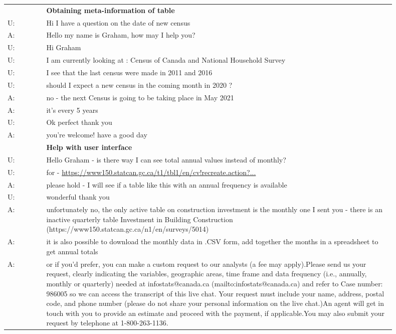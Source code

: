 \documentclass[11pt]{article}
\begin{document}
\begin{table*}[h]
    \small
    \centering
\begin{tabular}{l p{0.90\linewidth}}
\toprule
   & \textbf{Obtaining meta-information of table}\\
U: &  Hi I have a question on the date of new census \\
A: &  Hello my name is Graham, how may I help you? \\
U: &  Hi Graham \\
U: &  I am currently looking at : Census of Canada and National Household Survey \\
U: &  I see that the last census were made in 2011 and 2016 \\
U: &  should I expect a new census in the coming month in 2020 ? \\
A: &  no - the next Census is going to be taking place in May 2021 \\
A: &  it's every 5 years \\
U: &  Ok perfect thank you \\
A: &  you're welcome! have a good day \\
\midrule
& \textbf{Help with user interface}\\
U: & Hello Graham - is there way I can see total annual values instead of monthly?\\
U: & for - \href{https://www150.statcan.gc.ca/t1/tbl1/en/cv!recreate.action?pid=3410017501&selectedNodeIds=1D1,2D13,2D14,2D19,2D28,4D1&checkedLevels=2D1&refPeriods=20200201,20200601&dimensionLayouts=layout3,layout3,layout3,layout2,layout2&vectorDisplay=false}{https://www150.statcan.gc.ca/t1/tbl1/en/cv!recreate.action?...}\\
A: & please hold - I will see if a table like this with an annual frequency is available\\
U: & wonderful thank you\\
A: & unfortunately no, the only active table on construction investment is the monthly one I sent you - there is an inactive quarterly table Investment in Building Construction (https://www150.statcan.gc.ca/n1/en/surveys/5014)\\
A: & it is also possible to download the monthly data in .CSV form, add together the months in a spreadsheet to get annual totals\\
A: & or if you'd prefer, you can make a custom request to our analysts (a fee may apply).Please send us your request, clearly indicating the variables, geographic areas, time frame and data frequency (i.e., annually, monthly or quarterly) needed at infostats@canada.ca (mailto:infostats@canada.ca)  and refer to Case number: 986005 so we can access the transcript of this live chat.               Your request must include your name, address, postal code, and phone number (please do not share your personal information on the live chat.)An agent will get in touch with you to provide an estimate and proceed with the payment, if applicable.You may also submit your request by telephone at 1-800-263-1136.\\

\end{tabular}
\end{table*}
\end{document}
